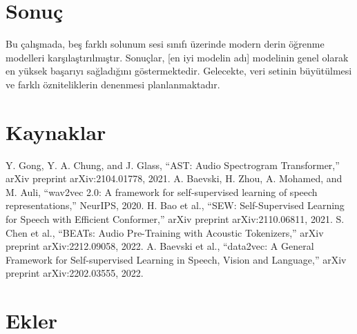 \documentclass[conference]{IEEEtran}
\begin{document}
\section{Sonuç}
Bu çalışmada, beş farklı solunum sesi sınıfı üzerinde modern derin öğrenme modelleri karşılaştırılmıştır. Sonuçlar, [en iyi modelin adı] modelinin genel olarak en yüksek başarıyı sağladığını göstermektedir. Gelecekte, veri setinin büyütülmesi ve farklı özniteliklerin denenmesi planlanmaktadır.

\section*{Kaynaklar}
\begin{thebibliography}{1}
 Y. Gong, Y. A. Chung, and J. Glass, ``AST: Audio Spectrogram Transformer,'' arXiv preprint arXiv:2104.01778, 2021.
 A. Baevski, H. Zhou, A. Mohamed, and M. Auli, ``wav2vec 2.0: A framework for self-supervised learning of speech representations,'' NeurIPS, 2020.
 H. Bao et al., ``SEW: Self-Supervised Learning for Speech with Efficient Conformer,'' arXiv preprint arXiv:2110.06811, 2021.
 S. Chen et al., ``BEATs: Audio Pre-Training with Acoustic Tokenizers,'' arXiv preprint arXiv:2212.09058, 2022.
 A. Baevski et al., ``data2vec: A General Framework for Self-supervised Learning in Speech, Vision and Language,'' arXiv preprint arXiv:2202.03555, 2022.
\end{thebibliography}

\section*{Ekler}
\end{document}
